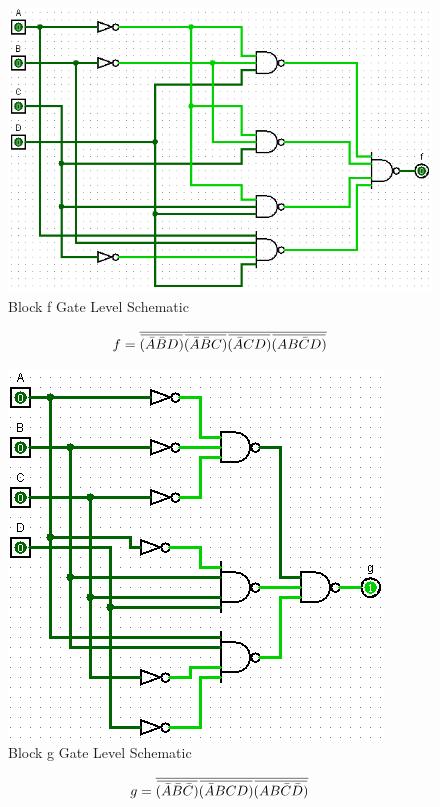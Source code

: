 \documentclass[12pt]{article}
\newcommand{\overbar}[1]{\mkern 1.5mu\overline{\mkern-1.5mu#1\mkern-1.5mu}\mkern 1.5mu} %
\begin{document}
\begin{figure}[h]
	\centering
	\label{fig:fBlockGates}
	\includegraphics[width=0.65\linewidth, keepaspectratio]{f_logicCkt}
	\caption{Block f Gate Level Schematic}
\end{figure}

\begin{equation}
	f = \overline{\overbar{(\bar{A}\bar{B}D)}\overbar{(\bar{A}\bar{B}C)}\overbar{(\bar{A}CD)}\overbar{(AB\bar{C}D)}}
\end{equation}

\begin{figure}[h]
	\centering
	\label{fig:gBlockGates}
	\includegraphics[width=0.65\linewidth, keepaspectratio]{g_logicCkt}
	\caption{Block g Gate Level Schematic}
\end{figure}

\begin{equation}
	g = \overline{\overbar{(\bar{A}\bar{B}\bar{C})}\overbar{(\bar{A}BCD)}\overbar{(AB\bar{C}\bar{D})}}
\end{equation}
\end{document}
